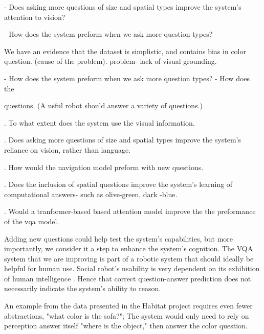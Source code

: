 - Does asking more questions of size and spatial types improve the system's attention to vision?

- How does the system preform when we ask more question types?


We have an evidence that the dataset is simplistic, and contains bias in color question. (cause of the problem). problem- lack of visual grounding. 

- How does the system preform when we ask more question types?
- How does the 

questions. (A usful robot should answer a variety of questions.)

. To what extent does the system use  the visual information.

. Does asking more questions of size and spatial types improve the system's reliance on vision, rather than language.

. How would the navigation model preform with new questions. 


. Does the inclusion of spatial questions improve the system's learning of computational answers- such as olive-green, dark -blue. 

. Would a tranformer-based based attention model improve the the preformance of the vqa model. 

Adding new questions could help test the system's capabilities, but more importantly, we consider it a step to enhance the system's cognition. The VQA system that we are improving is part of a robotic system that should ideally be helpful for human use. Social robot's usability is very dependent on its exhibition of human intelligence \cite{fong2003survey}. Hence that correct question-answer prediction does not necessarily indicate the system's ability to reason. 

An example from the data presented in the Habitat project requires even fewer abstractions, "what color is the sofa?"; The system would only need to rely on perception answer itself "where is the object," then answer the color question.
